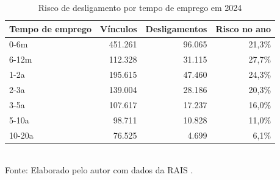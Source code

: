 \begin{table}[htbp]
    \centering
    \caption{Risco de desligamento por tempo de emprego em 2024}
    \label{tab:risco}
    \footnotesize
    \renewcommand{\arraystretch}{1.25}
    \begin{tabular}{lrrr}
        \toprule
        \rowcolor{black!8}
        \textbf{Tempo de emprego} & \textbf{Vínculos} & \textbf{Desligamentos} & \textbf{Risco no ano} \\
        \midrule
        0-6m & 451.261 & 96.065 & 21,3\% \\
        6-12m & 112.328 & 31.115 & 27,7\% \\
        1-2a & 195.615 & 47.460 & 24,3\% \\
        2-3a & 139.004 & 28.186 & 20,3\% \\
        3-5a & 107.617 & 17.237 & 16,0\% \\
        5-10a & 98.711 & 10.828 & 11,0\% \\
        10-20a & 76.525 & 4.699 & 6,1\% \\
        \bottomrule
    \end{tabular}
    \\[4pt]
    Fonte: Elaborado pelo autor com dados da RAIS \cite{RAIS2024}.
\end{table}
